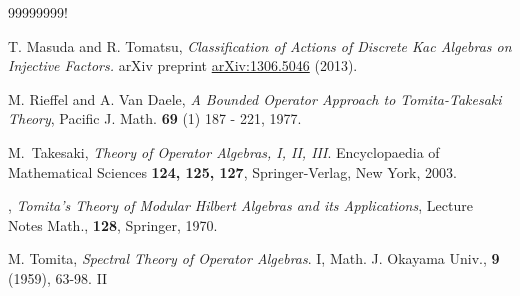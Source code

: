 \documentclass[12pt]{amsart}
\theoremstyle{definition}
\begin{document}
\begin{thebibliography}{99999999!}



 T. Masuda and R. Tomatsu, \emph{Classification of Actions of Discrete Kac Algebras on Injective Factors.} arXiv preprint \url{arXiv:1306.5046} (2013).





 M. Rieffel and A. Van Daele, \emph{A Bounded Operator Approach to Tomita-Takesaki Theory}, Pacific J. Math. {\bf 69} (1) 187 - 221, 1977.



 M.~Takesaki, \emph{Theory of Operator Algebras, I, II, III}. Encyclopaedia of Mathematical Sciences {\bf 124, 125, 127}, Springer-Verlag, New York, 2003.

 \bysame, \emph{Tomita's Theory of Modular Hilbert Algebras and its Applications}, Lecture Notes Math., {\bf 128}, Springer, 1970.

 M. Tomita, \emph{Spectral Theory of Operator Algebras}. I, Math. J. Okayama Univ., {\bf 9} (1959), 63-98. II


\end{thebibliography}

\end{document}
